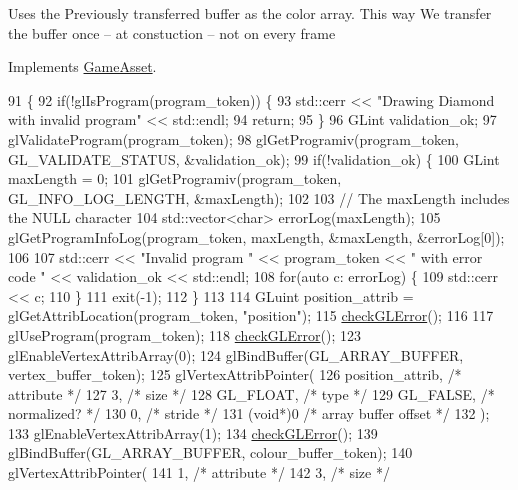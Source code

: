 Uses the Previously transferred buffer as the color array. This way We transfer the buffer once -- at constuction -- not on every frame

Implements \hyperlink{classGameAsset_a961aa51ca0a9961fc584c0b5d5431300}{Game\+Asset}.


\begin{DoxyCode}
91                                             \{
92   \textcolor{keywordflow}{if}(!glIsProgram(program\_token)) \{
93     std::cerr << \textcolor{stringliteral}{"Drawing Diamond with invalid program"} << std::endl;
94     \textcolor{keywordflow}{return};
95   \}
96   GLint validation\_ok;
97   glValidateProgram(program\_token);
98   glGetProgramiv(program\_token, GL\_VALIDATE\_STATUS, &validation\_ok);
99   \textcolor{keywordflow}{if}(!validation\_ok) \{
100     GLint maxLength = 0;
101     glGetProgramiv(program\_token, GL\_INFO\_LOG\_LENGTH, &maxLength);
102 
103     \textcolor{comment}{// The maxLength includes the NULL character}
104     std::vector<char> errorLog(maxLength);
105     glGetProgramInfoLog(program\_token, maxLength, &maxLength, &errorLog[0]);
106 
107     std::cerr << \textcolor{stringliteral}{"Invalid program "} << program\_token << \textcolor{stringliteral}{" with error code "} << validation\_ok << std::endl;
108     \textcolor{keywordflow}{for}(\textcolor{keyword}{auto} c: errorLog) \{
109       std::cerr << c;
110     \}
111     exit(-1);
112   \}
113 
114   GLuint position\_attrib = glGetAttribLocation(program\_token, \textcolor{stringliteral}{"position"});
115   \hyperlink{DiamondAsset_8cc_a75f201b0e53e68726854997957322b8d}{checkGLError}();
116 
117   glUseProgram(program\_token);
118   \hyperlink{DiamondAsset_8cc_a75f201b0e53e68726854997957322b8d}{checkGLError}();
123   glEnableVertexAttribArray(0);
124   glBindBuffer(GL\_ARRAY\_BUFFER, vertex\_buffer\_token);
125   glVertexAttribPointer(
126     position\_attrib,        \textcolor{comment}{/* attribute */}
127     3,        \textcolor{comment}{/* size */}
128     GL\_FLOAT,   \textcolor{comment}{/* type */}
129     GL\_FALSE,   \textcolor{comment}{/* normalized? */}
130     0,        \textcolor{comment}{/* stride */}
131     (\textcolor{keywordtype}{void}*)0    \textcolor{comment}{/* array buffer offset */}
132   );
133   glEnableVertexAttribArray(1);
134   \hyperlink{DiamondAsset_8cc_a75f201b0e53e68726854997957322b8d}{checkGLError}();
139   glBindBuffer(GL\_ARRAY\_BUFFER, colour\_buffer\_token);
140   glVertexAttribPointer(
141     1,        \textcolor{comment}{/* attribute */}
142     3,        \textcolor{comment}{/* size */}

\end{DoxyCode}
